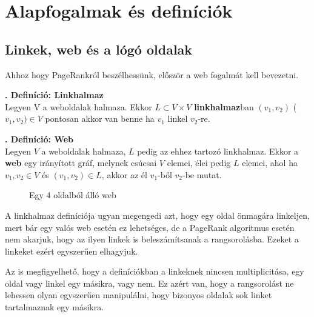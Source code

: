 \documentclass[12pt,a4paper]{article}
\newcounter{definicioszam}
\newenvironment{definicio}[1]
{{\medskip}\noindent \stepcounter{definicioszam}
{\bfseries{\thedefinicioszam. Definíció: #1\\[1ex]}}}{\bigskip }
\begin{document}
\section{Alapfogalmak és definíciók}

\subsection{Linkek, web és a lógó oldalak}\label{link_web_logooldal}

Ahhoz hogy PageRankról beszélhessünk, először a web fogalmát kell bevezetni.

\begin{definicio}{Linkhalmaz}
	Legyen V a weboldalak halmaza. Ekkor $L \subset V \times V$ \textbf{linkhalmaz}ban $(v_1,v_2) $ ($v_1, v_2) \in V$ pontosan akkor van benne ha $v_1$ linkel $v_2$-re. 
\end{definicio}

\begin{definicio}{Web}
	Legyen $V$ a weboldalak halmaza, $L$ pedig az ehhez tartozó linkhalmaz. Ekkor a \textbf{web} egy irányított gráf, melynek csúcsai $V$ elemei, élei pedig $L$ elemei, ahol ha $v_1, v_2 \in V$ és $(v_1,v_2) \in L$, akkor az él $v_1$-ből $v_2$-be mutat. 
\end{definicio}

\begin{figure}[h]
	\centering
	\caption{Egy 4 oldalból álló web}
\end{figure}

A linkhalmaz definíciója ugyan megengedi azt, hogy egy oldal önmagára linkeljen, mert bár egy valós web esetén ez lehetséges, de a PageRank algoritmus esetén nem akarjuk, hogy az ilyen linkek is beleszámítsanak a rangsorolásba. Ezeket a linkeket ezért egyszerűen elhagyjuk.

Az is megfigyelhető, hogy a definíciókban a linkeknek nincsen multiplicitása, egy oldal vagy linkel egy másikra, vagy nem. Ez azért van, hogy a rangsorolást ne lehessen olyan egyszerűen manipulálni, hogy bizonyos oldalak sok linket tartalmaznak egy másikra.  
\end{document}
